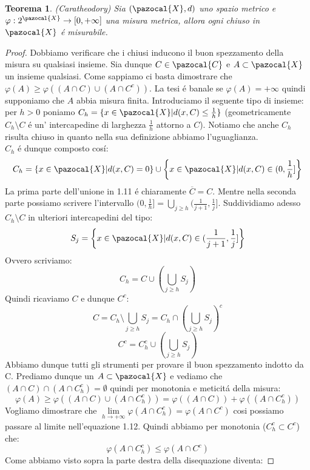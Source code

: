 \documentclass[11pt,a4paper]{report}
\theoremstyle{plain}
\newtheorem{thm}{Teorema}[chapter] %
\theoremstyle{definition}
\newcommand{\X}{\pazocal{X}}
\newcommand{\C}{\pazocal{C}}
\begin{document}
\begin{thm}(Caratheodory)
	Sia $(\X,d)$ uno spazio metrico e $\varphi : 2^\X \rightarrow [0,+\infty]$ una misura metrica, allora ogni chiuso in $\X$ \'e misurabile.
\end{thm}
\begin{proof}
Dobbiamo verificare che i chiusi inducono il buon spezzamento della misura su qualsiasi insieme. Sia dunque $C \in \C$ e $A \subset \X$ un insieme qualsiasi. Come sappiamo ci basta dimostrare che $\varphi(A) \ge \varphi((A \cap C) \cup (A \cap C^c))$. La tesi \'e banale se $\varphi(A) = + \infty$ quindi supponiamo che $A$ abbia misura finita. Introduciamo il seguente tipo di insieme: per $h > 0$ poniamo $C_h = \{x \in \X | d(x,C) \le \frac{1}{h}\}$ (geometricamente $C_h \setminus C$ \'e un' intercapedine di larghezza $\frac{1}{h}$ attorno a $C$). Notiamo che anche $C_h$ risulta chiuso in quanto nella sua definizione abbiamo l'uguaglianza.\\
$C_h$ \'e dunque composto cos\'i:
\begin{equation}
	C_h = \left\{x \in \X | d(x,C) = 0\right\} \cup \left\{x \in \X | d(x,C) \in (0,\frac{1}{h}]\right\}
\end{equation}
La prima parte dell'unione in 1.11 \'e chiaramente $\overline{C} = C$.
Mentre nella seconda parte possiamo scrivere l'intervallo $(0,\frac{1}{h}] = \bigcup\limits_{j \ge h}(\frac{1}{j+1}, \frac{1}{j}]$.
Suddividiamo adesso $C_h \setminus C$ in ulteriori intercapedini del tipo:
\[
	S_j = \left\{x \in \X | d(x,C) \in (\frac{1}{j+1},\frac{1}{j}]\right\}
\]
Ovvero scriviamo:
\[
	C_h = C \cup (\bigcup\limits_{j \ge h}S_j)
\]
Quindi ricaviamo $C$ e dunque $C^c$:
\[
	C = C_h \setminus \bigcup\limits_{j \ge h}S_j = C_h \cap (\bigcup\limits_{j \ge h}S_j)^c
\]
\[
	C^c = C_h^c \cup (\bigcup\limits_{j \ge h}S_j)
\]
Abbiamo dunque tutti gli strumenti per provare il buon spezzamento indotto da C. Prediamo dunque un $A \subset \X$ e vediamo che $(A \cap C) \cap (A \cap C_h^c) = \emptyset$ quindi per monotonia e meticit\'a della misura:
\begin{equation}
	\varphi(A) \ge \varphi((A \cap C) \cup (A \cap C_h^c)) = \varphi((A \cap C)) +  \varphi((A \cap C_h^c))
\end{equation}
Vogliamo dimostrare che $\lim\limits_{h \rightarrow +\infty}\varphi(A \cap C_h^c) = \varphi(A \cap C^c)$ cosi possiamo passare al limite nell'equazione 1.12. Quindi abbiamo per monotonia ($C_h^c \subset C^c$) che:
\[
	\varphi(A \cap C_h^c) \le \varphi(A \cap C^c)
\]
Come abbiamo visto sopra la parte destra della disequazione diventa:

\end{proof}
\end{document}
